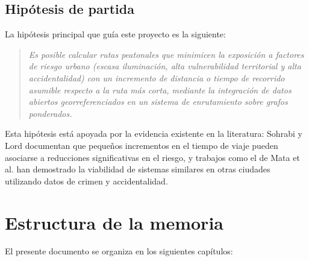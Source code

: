 \subsection{Hipótesis de partida}
\label{subsec:hipotesis}

La hipótesis principal que guía este proyecto es la siguiente:

\begin{quote}
\textit{Es posible calcular rutas peatonales que minimicen la exposición a factores de riesgo urbano (escasa iluminación, alta vulnerabilidad territorial y alta accidentalidad) con un incremento de distancia o tiempo de recorrido asumible respecto a la ruta más corta, mediante la integración de datos abiertos georreferenciados en un sistema de enrutamiento sobre grafos ponderados.}
\end{quote}

Esta hipótesis está apoyada por la evidencia existente en la literatura: Sohrabi y Lord \cite{sohrabilord2022} documentan que pequeños incrementos en el tiempo de viaje pueden asociarse a reducciones significativas en el riesgo, y trabajos como el de Mata et al. \cite{mata2016} han demostrado la viabilidad de sistemas similares en otras ciudades utilizando datos de crimen y accidentalidad.

\section{Estructura de la memoria}
\label{sec:estructura}

El presente documento se organiza en los siguientes capítulos:


